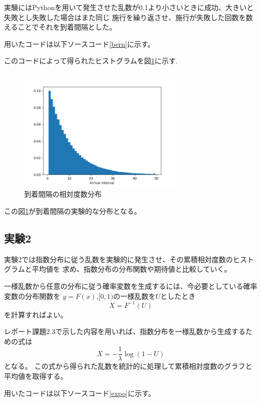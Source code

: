 \documentclass[a4paper,11pt,dvipdfmx]{jsarticle}
\begin{document}
実験にはPythonを用いて発生させた乱数が0.1より小さいときに成功、大きいと失敗とし失敗した場合はまた同じ
施行を繰り返させ、施行が失敗した回数を数えることでそれを到着間隔とした。

用いたコードは以下ソースコード\ref{bern}に示す。


このコードによって得られたヒストグラムを図\ref{berhist}に示す.
\begin{figure}[ht]
\centering
\includegraphics[width=80mm]{Bernoulli.png}
\caption{到着間隔の相対度数分布}
\label{berhist}
\end{figure}

この図\ref{berhist}が到着間隔の実験的な分布となる。

\subsection{実験2}
実験2では指数分布に従う乱数を実験的に発生させ、その累積相対度数のヒストグラムと平均値を
求め、指数分布の分布関数や期待値と比較していく。

一様乱数から任意の分布に従う確率変数を生成するには、今必要としている確率変数の分布関数を
$y=F(x)$,$[0,1)$の一様乱数を$U$としたとき
\begin{equation}
    X=F^{-1}(U)
\end{equation}
を計算すればよい。

レポート課題2.3で示した内容を用いれば、指数分布を一様乱数から生成するための式は
\begin{equation}
    X = -\frac{1}{\lambda}\log(1-U)
\end{equation}
となる。
この式から得られた乱数を統計的に処理して累積相対度数のグラフと平均値を取得する。

用いたコードは以下ソースコード\ref{expo}に示す。

\end{document}
